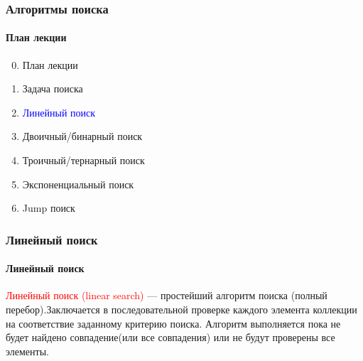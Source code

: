 \documentclass[aspectratio=169]{beamer}
\begin{document}
\begin{frame}
\frametitle{Алгоритмы поиска}
\framesubtitle{План лекции}

\begin{enumerate}
  \setcounter{enumi}{-1}
  \item{План лекции}
  \item{Задача поиска}
  \item{\textcolor{blue}{Линейный поиск}}
  \item{Двоичный/бинарный поиск}
  \item{Троичный/тернарный поиск}
  \item{Экспоненциальный поиск}
  \item{Jump поиск}
\end{enumerate}
\end{frame}


\begin{frame}
\frametitle{Линейный поиск}
\framesubtitle{Линейный поиск}
\justifying
\textcolor{red}{Линейный поиск (linear search)} — простейший алгоритм поиска (полный перебор).\newline\newline Заключается в последовательной проверке каждого элемента коллекции на \newline соответствие заданному критерию поиска. \newline\newline Алгоритм выполняется пока не будет найдено совпадение(или все совпадения) или не будут проверены все элементы.

\begin{figure}
    \captionsetup[subfigure]{labelformat=empty}
    \centering
\end{figure}
\end{frame}
\end{document}

